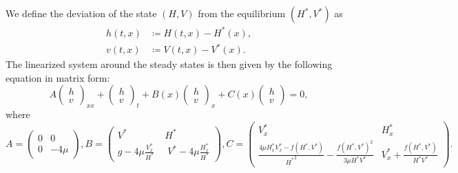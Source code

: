 \documentclass[11pt]{article}
\begin{document}
We define the deviation of the state $(H,V)$ from the equilibrium $(H^{*},V^{*})$ as
\begin{equation}
    \begin{split}
        h(t,x) &\coloneqq H(t,x) - H^*(x), \\
        v(t,x) &\coloneqq V(t,x) - V^*(x).        
    \end{split}
\end{equation}
The linearized system around the steady states is then given by the following equation in matrix form:
\begin{equation}
A \begin{pmatrix}h \\ v\end{pmatrix}_{xx} + \begin{pmatrix}h \\ v\end{pmatrix}_t + B(x) \begin{pmatrix}h \\ v\end{pmatrix}_x + C(x) \begin{pmatrix}h \\ v\end{pmatrix} = 0,
\label{eq:linear_system}
\end{equation}
where
\begin{subequations}
\begin{equation}
A = \begin{pmatrix}0 & 0 \\ 0 & -4\mu \end{pmatrix},
\label{eq:linear_A}
\end{equation}
\begin{equation}
B = \begin{pmatrix}V^* & H^* \\ g - 4\mu \frac{V^{*}_x}{{H^{*}}} \;& \;{V^{*}} - 4\mu \frac{H^{*}_x}{{H^{*}}} \end{pmatrix},
\label{eq:linear_B}
\end{equation}
\begin{equation}
C = \begin{pmatrix} V^{*}_x & H^{*}_x \\ 
 {\frac{4\mu {H^{*}_x}{V^{*}_x} - f(H^{*}, V^{*})}{{H^{*}}^2} - \frac{f(H^{*}, V^{*})^{2}}{3 \mu {H^{*}} {V^{*}}}} & {{V^{*}_x} + \frac{f(H^{*}, V^{*})}{{H^{*}}  V^{*}}} \end{pmatrix}.
\label{eq:linear_C}
\end{equation}
\end{subequations}
\end{document}
